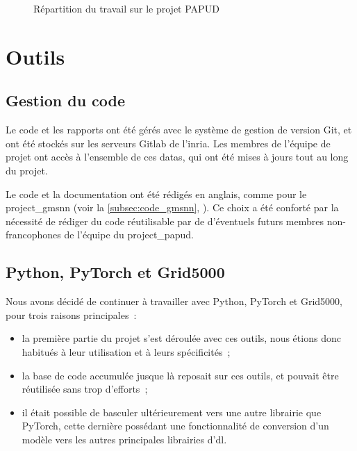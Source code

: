 \begin{figure}[ht]
	\centering
	\caption[Répartition du travail sur le projet PAPUD]{Répartition du travail sur le projet PAPUD}\label{fig:papud_time}
\end{figure}

\section{Outils}
\subsection{Gestion du code}
Le code et les rapports ont été gérés avec le système de gestion de version Git, et ont été stockés sur les serveurs Gitlab de l'\gls{inria}. Les membres de l'équipe de projet ont accès à l'ensemble de ces \glspl{data}, qui ont été mises à jours tout au long du projet.

Le code et la documentation ont été rédigés en anglais, comme pour le \gls{project_gmsnn} (voir la \autoref{subsec:code_gmsnn}, ). Ce choix a été conforté par la nécessité de rédiger du code réutilisable par de d'éventuels futurs membres non-francophones de l'équipe du \gls{project_papud}.

\subsection{Python, PyTorch et Grid5000}
Nous avons décidé de continuer à travailler avec Python, PyTorch et Grid5000, pour trois raisons principales~:
\begin{itemize}
	\item la première partie du projet s'est déroulée avec ces outils, nous étions donc habitués à leur utilisation et à leurs spécificités~;
	\item la base de code accumulée jusque là reposait sur ces outils, et pouvait être réutilisée sans trop d'efforts~;
	\item il était possible de basculer ultérieurement vers une autre librairie que  PyTorch, cette dernière possédant une fonctionnalité de conversion d'un modèle vers les autres principales librairies d'\gls{dl}.
\end{itemize}